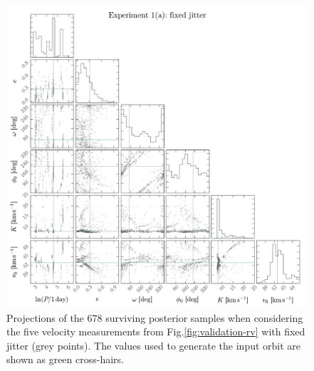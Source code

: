 \documentclass[manuscript, letterpaper]{aastex6}
\begin{document}
\begin{figure}[p]
\begin{center}
\includegraphics[width=\textwidth]{figures/validation-corner-a.pdf}
\end{center}
\caption{%
Projections of the 678 surviving posterior samples when considering the five velocity measurements from
Fig.\ref{fig:validation-rv} with fixed jitter (grey
points).
The values used to generate the input orbit are shown as green cross-hairs.
\label{fig:validation-corner-a}}
\end{figure}
\end{document}
